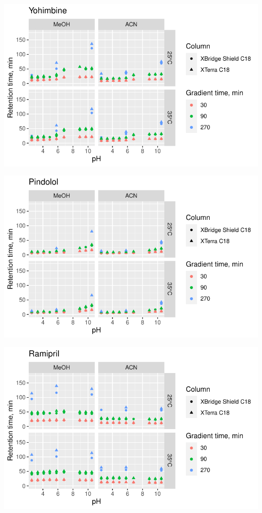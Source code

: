 \documentclass[
  letterpaper,
  DIV=11,
  numbers=noendperiod]{scrreprt}
\begin{document}
\includegraphics{index_files/figure-pdf/unnamed-chunk-4-54.pdf}

\includegraphics{index_files/figure-pdf/unnamed-chunk-4-55.pdf}

\includegraphics{index_files/figure-pdf/unnamed-chunk-4-56.pdf}
\end{document}
